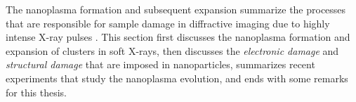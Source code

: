 %
The nanoplasma formation and subsequent expansion summarize the processes that are responsible for sample damage in diffractive imaging due to highly intense X-ray pulses \cite{Ditmire-1996-PRA}. This section first discusses the nanoplasma formation and expansion of clusters in soft X-rays, then discusses the \textit{electronic damage} and \textit{structural damage} that are imposed in nanoparticles, summarizes recent experiments that study the nanoplasma evolution, and ends with some remarks for this thesis.\\[1\baselineskip]
%

